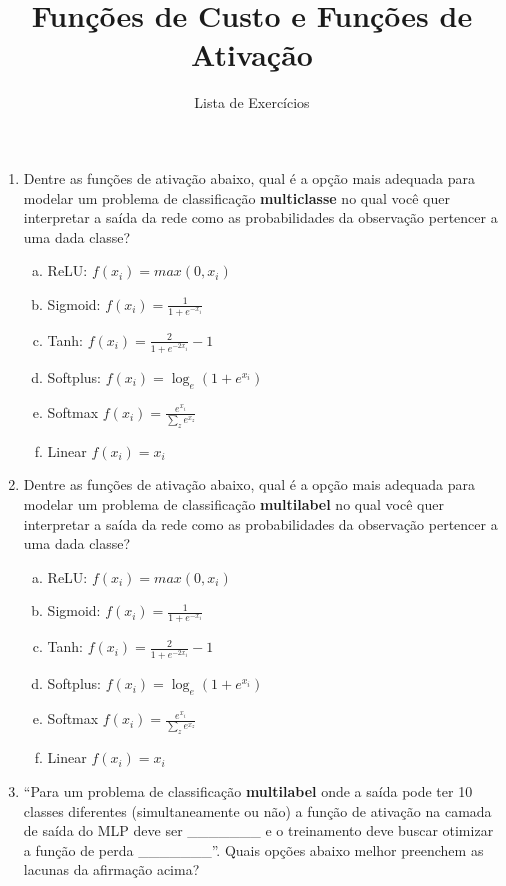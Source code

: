 \documentclass{dlproblemset}
\title{Funções de Custo e Funções de Ativação}
\subtitle{Lista de Exercícios}
\begin{document}
\begin{enumerate}[1)]

    \item Dentre as funções de ativação abaixo, qual é a opção mais adequada para modelar um problema de classificação \textbf{multiclasse} no qual você quer interpretar a saída da rede como as probabilidades da observação pertencer a uma dada classe?
    \begin{enumerate}[(a)]
        \item ReLU: $f(x_{i}) = max(0,x_{i})$
        \item Sigmoid: $f(x_{i}) = \frac{1}{1 + e^{-x_{i}}}$
        \item Tanh: $f(x_{i}) = \frac{2}{1 + e^{-2x_{i}}}-1$
        \item Softplus: $f(x_{i}) = \log_{e}(1 + e^{x_{i}})$
        \item Softmax $f(x_{i}) = \frac{e^{x_{i}}}{\sum_{z} e^{x_{z}}}$
        \item Linear $f(x_{i}) = x_{i}$
    \end{enumerate}

    \item Dentre as funções de ativação abaixo, qual é a opção mais adequada para modelar um problema de classificação \textbf{multilabel} no qual você quer interpretar a saída da rede como as probabilidades da observação pertencer a uma dada classe?
    \begin{enumerate}[(a)]
        \item ReLU: $f(x_{i}) = max(0,x_{i})$
        \item Sigmoid: $f(x_{i}) = \frac{1}{1 + e^{-x_{i}}}$
        \item Tanh: $f(x_{i}) = \frac{2}{1 + e^{-2x_{i}}}-1$
        \item Softplus: $f(x_{i}) = \log_{e}(1 + e^{x_{i}})$
        \item Softmax $f(x_{i}) = \frac{e^{x_{i}}}{\sum_{z} e^{x_{z}}}$
        \item Linear $f(x_{i}) = x_{i}$
    \end{enumerate}

    \item ``Para um problema de classificação \textbf{multilabel} onde a saída pode ter 10 classes diferentes (simultaneamente ou não) a função de ativação na camada de saída do MLP deve ser \_\_\_\_\_\_\_  e o treinamento deve buscar otimizar a função de perda \_\_\_\_\_\_\_''. Quais opções abaixo melhor preenchem as lacunas da afirmação acima?


\end{enumerate}
\end{document}
